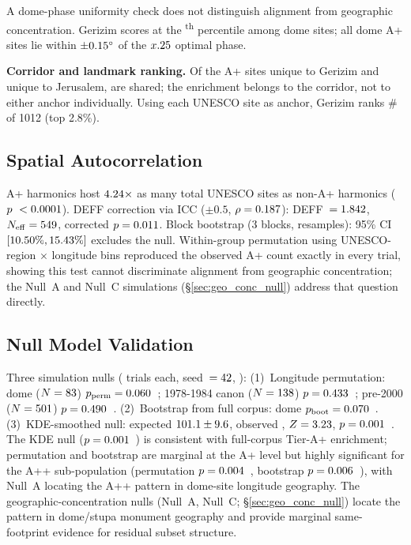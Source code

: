 A dome-phase uniformity check does not distinguish alignment from
geographic concentration. Gerizim scores at the
\domeGerizimPctile\textsuperscript{th} percentile among dome sites; all
\NcircTierAp{} dome A+ sites lie within $\pm 0.15\textdegree{}$ of the
$x.25$\textdegree{} optimal phase.

\textbf{Corridor and landmark ranking.}
Of the \corridorUniqueGer{} A+ sites unique to Gerizim and
\corridorUniqueJer{} unique to Jerusalem, \corridorSharedAp{} are shared;
the enrichment belongs to the corridor, not to either anchor individually.
Using each UNESCO site as anchor, Gerizim ranks
\#\GerizimTempleRank{} of 1012 (top 2.8\%).

\subsection{Spatial Autocorrelation}
\label{sec:autocorrelation}

A+ harmonics host $4.24\times$ as many total UNESCO
sites as non-A+ harmonics ($p\ < 0.0001$).
DEFF correction via ICC ($\pm 0.5$\textdegree{}, $\rho = 0.187$):
DEFF~$= 1.842$, $N_\mathrm{eff} = 549$,
corrected $p = 0.011$.
Block bootstrap (3\textdegree{} blocks, \simNperms{} resamples):
95\% CI $[10.50\%, 15.43\%]$ excludes the \NullRateAp{} null.
Within-group permutation using UNESCO-region $\times$ longitude bins
reproduced the observed A+ count exactly in every trial, showing this
test cannot discriminate alignment from geographic concentration;
the Null~A and Null~C simulations (\S\ref{sec:geo_conc_null})
address that question directly.

\subsection{Null Model Validation}
\label{sec:simulation_null}

Three simulation nulls (\simNperms{} trials each, seed~$= 42{}$,
\citealt{good2005permutation}):
(1)~Longitude permutation: dome ($N = 83$)
$p_\mathrm{perm} = 0.060$~\simDomePermPSig{};
1978-1984 canon ($N = 138$) $p = 0.433$~\simCanonPermPSig{};
pre-2000 ($N = 501$) $p = 0.490$~\simPreTwoKPermPSig{}.
(2)~Bootstrap from full corpus: dome $p_\mathrm{boot} = 0.070$~\simDomeBootPSig{}.
(3)~KDE-smoothed null: expected $101.1 \pm 9.6$, observed \Nap{}, $Z = 3.23$,
$p = 0.001$~\simKDEPSig{}.
The KDE null ($p = 0.001$~\simKDEPSig{}) is consistent with full-corpus
Tier-A+ enrichment; permutation and bootstrap are marginal at the A+ level but
highly significant for the A++ sub-population
(permutation $p = 0.004$~\pCircAppPermSig{},
bootstrap $p = 0.006$~\pCircAppBootSig{}), with Null~A
locating the A++ pattern in dome-site longitude geography.
The geographic-concentration nulls (Null~A, Null~C;
\S\ref{sec:geo_conc_null}) locate the pattern in dome/stupa monument
geography and provide marginal same-footprint evidence for residual
subset structure.

